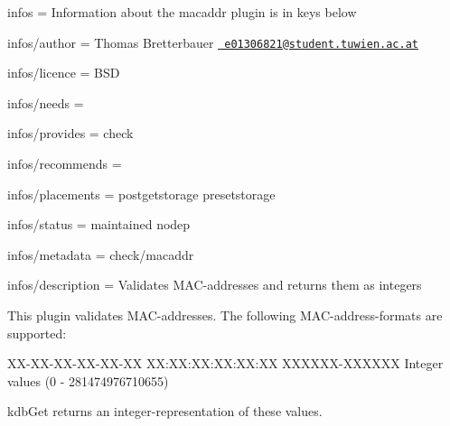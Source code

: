 
\begin{DoxyItemize}
\item infos = Information about the macaddr plugin is in keys below
\item infos/author = Thomas Bretterbauer \href{mailto:e01306821@student.tuwien.ac.at}{\texttt{ e01306821@student.\+tuwien.\+ac.\+at}}
\item infos/licence = B\+SD
\item infos/needs =
\item infos/provides = check
\item infos/recommends =
\item infos/placements = postgetstorage presetstorage
\item infos/status = maintained nodep
\item infos/metadata = check/macaddr
\item infos/description = Validates M\+A\+C-\/addresses and returns them as integers
\end{DoxyItemize}

This plugin validates M\+A\+C-\/addresses. The following M\+A\+C-\/address-\/formats are supported\+: \begin{DoxyVerb}XX-XX-XX-XX-XX-XX
XX:XX:XX:XX:XX:XX
XXXXXX-XXXXXX
Integer values (0 - 281474976710655)
\end{DoxyVerb}


{\ttfamily kdb\+Get} returns an integer-\/representation of these values.


